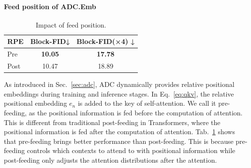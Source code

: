 \documentclass{article}
\begin{document}
\paragraph{Feed position of ADC.Emb} 
\begin{table}
\vspace{-0.25in}
\centering
\vskip 0.1in
\setlength{\tabcolsep}{2.5pt}
\begin{tabular}{lcc}
    \toprule
    RPE  & Block-FID↓ & Block-FID(×4) ↓ \\ \hline
    Pre  & \textbf{10.05}      & \textbf{17.78}         \\
    Post & 10.47      & 18.89  \\  
    \bottomrule
    \end{tabular}
\caption{Impact of feed position.}
 \label{tab:adcemb}
\end{table}
As introduced in Sec.~\ref{sec:adc}, ADC dynamically provides relative positional embeddings during training and inference stages. In Eq.~\ref{eq:qkv}, the relative positional embedding $e_n$ is added to the key of self-attention. We call it pre-feeding, as the positional information is fed before the computation of attention. This is different from traditional post-feeding in Transformers, where the positional information is fed after the computation of attention. Tab.~\ref{tab:adcemb} shows that pre-feeding brings better performance than post-feeding. This is because pre-feeding controls which contexts to attend to with positional information while post-feeding only adjusts the attention distributions after the attention. 










\end{document}
